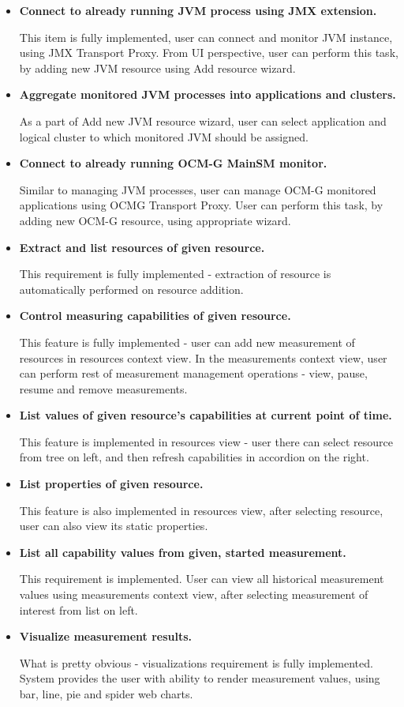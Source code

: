 \begin{itemize}
 \item {\bf Connect to already running JVM process using JMX extension.} 

This item is fully implemented, user can connect and monitor JVM instance, using JMX Transport Proxy. From UI perspective, user can perform this task, by adding new JVM resource using Add resource wizard.

 \item {\bf Aggregate monitored JVM processes into applications and clusters.}

As a part of Add new JVM resource wizard, user can select application and logical cluster to which monitored JVM should be assigned.

 \item {\bf Connect to already running OCM-G MainSM monitor.}

Similar to managing JVM processes, user can manage OCM-G monitored applications using OCMG Transport Proxy. User can perform this task, by adding new OCM-G resource, using appropriate wizard.

 \item {\bf Extract and list resources of given resource.}

This requirement is fully implemented - extraction of resource is automatically performed on resource addition.

 \item {\bf Control measuring capabilities of given resource.}

This feature is fully implemented - user can add new measurement of resources in resources context view. In the measurements context view, user can perform rest of measurement management operations - view, pause, resume and remove measurements.

 \item {\bf List values of given resource's capabilities at current point of time.}

This feature is implemented in resources view - user there can select resource from tree on left, and then refresh capabilities in accordion on the right.

\item {\bf List properties of given resource.}

This feature is also implemented in resources view, after selecting resource, user can also view its static properties.

 \item {\bf List all capability values from given, started measurement.}

This requirement is implemented. User can view all historical measurement values using measurements context view, after selecting measurement of interest from list on left.

 \item {\bf Visualize measurement results.}

What is pretty obvious - visualizations requirement is fully implemented. System provides the user with ability to render measurement values, using bar, line, pie and spider web charts.

\end{itemize}

